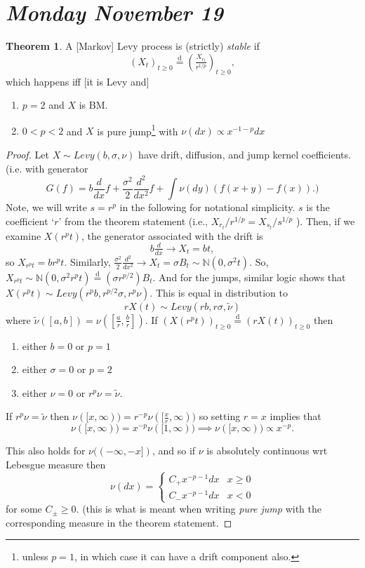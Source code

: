 \documentclass[12pt]{amsart}
\newcommand{\disteq}{\overset{ \text{d} }{=}}
\newcommand{\N}{\mathbb{N}}    %
\theoremstyle{definition}
\newtheorem{thm}{Theorem}[section]
\begin{document}
\section{\emph{Monday November 19}} 

\begin{thm}
A [Markov] Levy process is (strictly) \emph{stable} if 
$$
(X_t)_{t \geq 0} \disteq (\tfrac{X_{r_t}}{ r^{1/p}})_{t \geq 0}, 
$$
which happens iff [it is Levy and]
\begin{enumerate}
\item $p = 2$ and $X$ is BM.
\item $0 < p < 2$ and $X$ is pure jump\footnote{unless $p=1$, in which case it can have a drift component also.} with $\nu(dx) \propto x^{-1-p} dx$
\end{enumerate}
\end{thm}

\begin{proof}
Let $X \sim Levy(b,\sigma,\nu)$ have drift, diffusion, and jump kernel coefficients. (i.e. with generator 
$$
G(f) = b \frac{d}{dx} f + \frac{\sigma^2}{2} \frac{d^2}{dx^2} f + \int \nu (dy) (f(x+y) - f(x) ). )
$$ 
Note, we will write $s = r^p$ in the following for notational simplicity. $s$ is the coefficient `$r$' from the theorem statement (i.e., $X_{r_t} / r^{1/p} = X_{s_t} / s^{1/p}$ ). Then, if we examine $X(r^p t)$, the generator associated with the drift is 
$$b \tfrac{d}{dx} \rightarrow X_t = bt,
$$
so $X_{r^p t} = br^p t$. Similarly, $\frac{\sigma^2}{2} \tfrac{d^2}{dx^2} \rightarrow X_t = \sigma B_t \sim \N (0,\sigma^2t)$. So, $X_{r^p t} \sim \N(0, \sigma^2 r^p t) \disteq (\sigma r^{p/2}) B_t$. And for the jumps, similar logic shows that $X(r^p t) \sim Levy ( r^p b, r^{p/2} \sigma, r^p \nu)$. This is equal in distribution to 
$$
r X(t) \sim Levy ( rb, r \sigma, \tilde{\nu})
$$
where $\tilde{\nu}([a,b]) = \nu( [\tfrac{a}{r}, \tfrac{b}{r}] )$. If $(X(r^p t))_{t \geq 0} \disteq (r X(t))_{t \geq 0}$ then 
\begin{enumerate}
\item either $b = 0$ or $p=1$
\item either $\sigma = 0$ or $p=2$
\item either $\nu = 0$ or $r^p \nu = \tilde{\nu}$.
\end{enumerate} 

If $r^p \nu = \tilde{\nu}$ then $\nu ( [x, \infty) ) = r^{-p} \nu ( [\frac{x}{r}, \infty ) )$ so setting $r = x$ implies that 
$$
\nu ( [x , \infty) ) = x^{-p} \nu( [1, \infty) ) \implies \nu ([x, \infty)) \propto x^{-p}.
$$

This also holds for $\nu( (- \infty, -x])$, and so if $\nu$ is absolutely continuous wrt Lebesgue measure then 
$$
\nu(dx) = 
\begin{cases}
C_+ x^{-p-1} dx & x \geq 0 \\
C_{-} x^{-p-1} dx & x < 0
\end{cases}
$$
for some $C_\pm \geq 0$. (this is what is meant when writing \emph{pure jump} with the corresponding measure in the theorem statement.
\end{proof}
\end{document}
